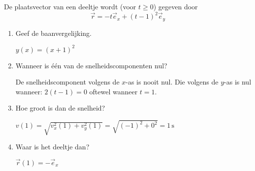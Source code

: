 \documentclass{ximera}
\begin{document}
\begin{exercise}





 De plaatsvector van een deeltje wordt (voor $t\geq0$) gegeven door
\begin{equation*}
	\vec{r}=-t\vec{e}_x+(t-1)^2\vec{e}_y
\end{equation*}
\begin{enumerate}
\item Geef de baanvergelijking.

\begin{oplossing}
	$y(x)=(x+1)^2$
\end{oplossing}

\item Wanneer is \'e\'en van de snelheidscomponenten nul?

\begin{oplossing}
	De snelheidscomponent volgens de $x$-as is nooit nul. Die volgens de $y$-as is nul wanneer: $2(t-1)=0$ oftewel wanneer $t=1$.
\end{oplossing}

\item Hoe groot is dan de snelheid?

\begin{oplossing}
	$v(1)=\sqrt{v_x^2(1)+v_y^2(1)}=\sqrt{(-1)^2+0^2}=1\,\text{s}$
\end{oplossing}

\item Waar is het deeltje dan?

\begin{oplossing}
	$\vec{r}(1)=-\vec{e}_x$
\begin{center}
\end{center}
\end{oplossing}


\end{enumerate}
\end{exercise}
\end{document}
